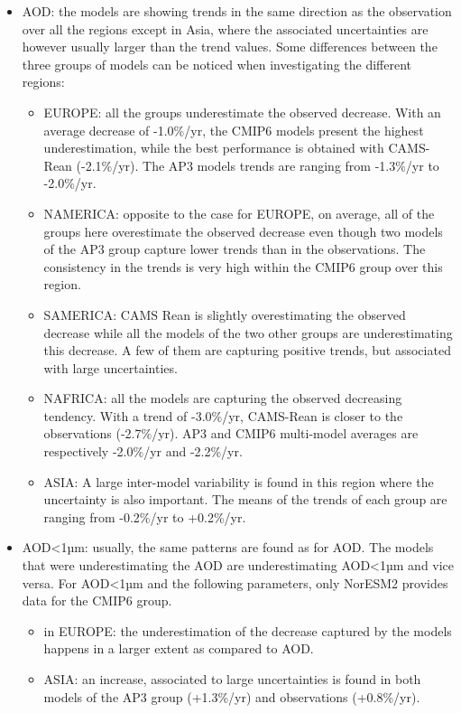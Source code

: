 \documentclass[journal abbreviation, manuscript]{copernicus}
\begin{document}
\begin{itemize}
 \item AOD: the models are showing trends in the same direction as the observation over all the regions except in Asia, where the associated uncertainties are however usually larger than the trend values. Some differences between the three groups of models can be noticed when investigating the different regions:
       \begin{itemize}
        \item EUROPE: all the groups underestimate the observed decrease. With an average decrease of -1.0\%/yr, the CMIP6 models present the highest underestimation, while the best performance is obtained with CAMS-Rean (-2.1\%/yr). The AP3 models trends are ranging from -1.3\%/yr to -2.0\%/yr.
        \item NAMERICA: opposite to the case for EUROPE, on average, all of the groups here overestimate the observed decrease even though two models of the AP3 group capture lower trends than in the observations. The consistency in the trends is very high within the CMIP6 group over this region.
        \item SAMERICA: CAMS Rean is slightly overestimating the observed decrease while all the models of the two other groups are underestimating this decrease. A few of them are capturing positive trends, but associated with large uncertainties.
        \item NAFRICA: all the models are capturing the observed decreasing tendency. With a trend of -3.0\%/yr, CAMS-Rean is closer to the observations (-2.7\%/yr). AP3 and CMIP6 multi-model averages are respectively -2.0\%/yr and -2.2\%/yr.
        \item ASIA: A large inter-model variability is found in this region where the uncertainty is also important. The means of the trends of each group are ranging from -0.2\%/yr to +0.2\%/yr.
       \end{itemize}
 \item AOD<1µm: usually, the same patterns are found as for AOD. The models that were underestimating the AOD are underestimating AOD<1µm and vice versa. For AOD<1µm and the following parameters, only NorESM2 provides data for the CMIP6 group.
       \begin{itemize}
        \item in EUROPE: the underestimation of the decrease captured by the models happens in a larger extent as compared to AOD.
        \item ASIA: an increase, associated to large uncertainties is found in both models of the AP3 group (+1.3\%/yr) and observations (+0.8\%/yr).

\end{itemize}
\end{itemize}
\end{document}
